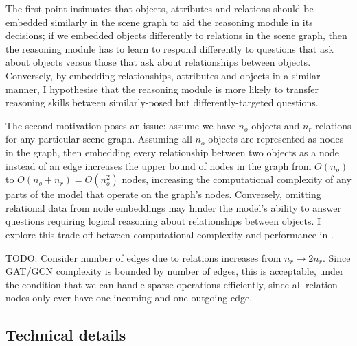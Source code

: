 The first point insinuates that objects, attributes and relations should be embedded similarly in the scene graph to aid the reasoning module in its decisions; if we embedded objects differently to relations in the scene graph, then the reasoning module has to learn to respond differently to questions that ask about objects versus those that ask about relationships between objects. Conversely, by embedding relationships, attributes and objects in a similar manner, I hypothesise that the reasoning module is more likely to transfer reasoning skills between similarly-posed but differently-targeted questions.

The second motivation poses an issue: assume we have \(n_o\) objects and \(n_r\) relations for any particular scene graph. Assuming all \(n_o\) objects are represented as nodes in the graph, then embedding every relationship between two objects as a node instead of an edge increases the upper bound of nodes in the graph from \(O(n_o)\) to \(O(n_o + n_r) = O(n_o^2)\) nodes, increasing the computational complexity of any parts of the model that operate on the graph's nodes. Conversely, omitting relational data from node embeddings may hinder the model's ability to answer questions requiring logical reasoning about relationships between objects. I explore this trade-off between computational complexity and performance in \sectionautorefname{ \ref{sec:ablation_studies}}.

{\color{red} TODO: Consider number of edges due to relations increases from \(n_r \rightarrow 2n_r\). Since GAT/GCN complexity is bounded by number of edges, this is acceptable, under the condition that we can handle sparse operations efficiently, since all relation nodes only ever have one incoming and one outgoing edge.}

\subsection{Technical details}
\label{sec:scene_graph_embedding_details}

